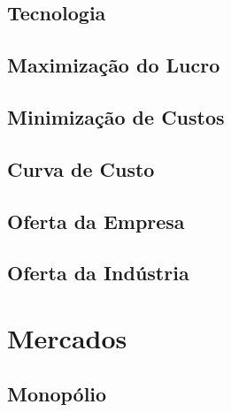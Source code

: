\documentclass[a4paper,11pt,oneside]{book}
\theoremstyle{definition}
\theoremstyle{break}
\begin{document}
\chapter{Tecnologia}

\chapter{Maximização do Lucro}

\chapter{Minimização de Custos}

\chapter{Curva de Custo}

\chapter{Oferta da Empresa}

\chapter{Oferta da Indústria}

\part{Mercados}

\chapter{Monopólio}
\end{document}
